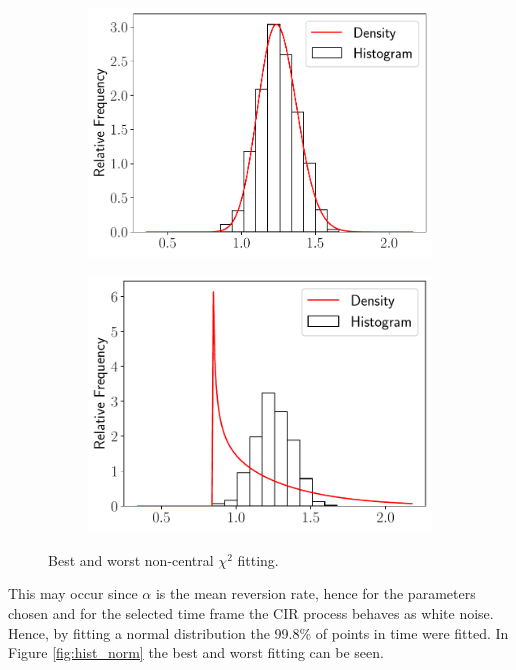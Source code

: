 \documentclass[11pt]{article}
\theoremstyle{definition}
\theoremstyle{remark}
\theoremstyle{remark}
\begin{document}
\begin{figure}
  \centering
  \begin{subfigure}[b]{0.45\textwidth}
    \centering
    \includegraphics[scale=.45]{maxp_ncx2_histogram_eachT}
  \end{subfigure}
    \begin{subfigure}[b]{0.45\textwidth}
    \centering
    \includegraphics[scale=.45]{minp_ncx2_histogram_eachT}
  \end{subfigure}
  \caption{Best and worst non-central $\chi^2$ fitting.}
  \label{fig:hist_chi2}
\end{figure}

This may occur since $\alpha$ is the mean reversion rate, hence for
the parameters chosen and for the selected time frame the CIR process
behaves as white noise. Hence, by fitting a normal distribution the
99.8\% of points in time were fitted. In Figure \ref{fig:hist_norm}
the best and worst fitting can be seen.
\end{document}
